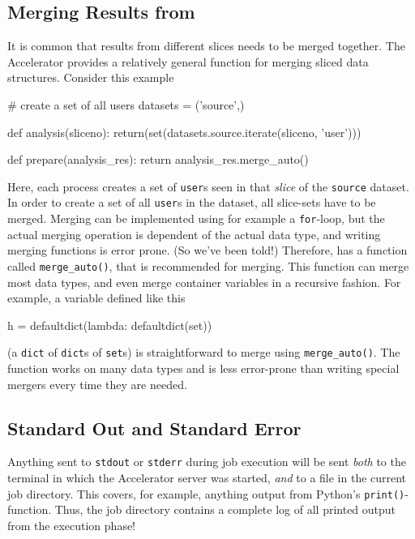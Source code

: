 \subsection{Merging Results from \analysis}
It is common that results from different slices needs to be merged
together.  The Accelerator provides a relatively general function for
merging sliced data structures.  Consider this example
\begin{python}
# create a set of all users
datasets = ('source',)
  
def analysis(sliceno):
    return(set(datasets.source.iterate(sliceno, 'user')))

def prepare(analysis_res):
    return analysis_res.merge_auto()
\end{python}
Here, each \analysis process creates a set of \texttt{user}s seen in
that \textsl{slice} of the \texttt{source} dataset.  In order to
create a set of all \texttt{user}s in the dataset, all slice-sets have
to be merged.  Merging can be implemented using for example a
\texttt{for}-loop, but the actual merging operation is dependent of
the actual data type, and writing merging functions is error
prone. (So we've been told!)  Therefore, \analysisres has a function
called \texttt{merge\_auto()}, that is recommended for merging.  This
function can merge most data types, and even merge container variables
in a recursive fashion.  For example, a variable defined like this
\begin{python}
h = defaultdict(lambda: defaultdict(set))
\end{python}
(a \texttt{dict} of \texttt{dict}s of \texttt{set}s) is
straightforward to merge using \texttt{merge\_auto()}.  The function
works on many data types and is less error-prone than writing special
mergers every time they are needed.


\subsection{Standard Out and Standard Error}
\label{sec:OUTPUT}
Anything sent to \texttt{stdout} or \texttt{stderr} during job
execution will be sent \textsl{both} to the terminal in which the
Accelerator server was started, \textsl{and} to a file in the current
job directory.  This covers, for example, anything output from
Python's \texttt{print()}-function.  Thus, the job directory contains
a complete log of all printed output from the execution phase!

